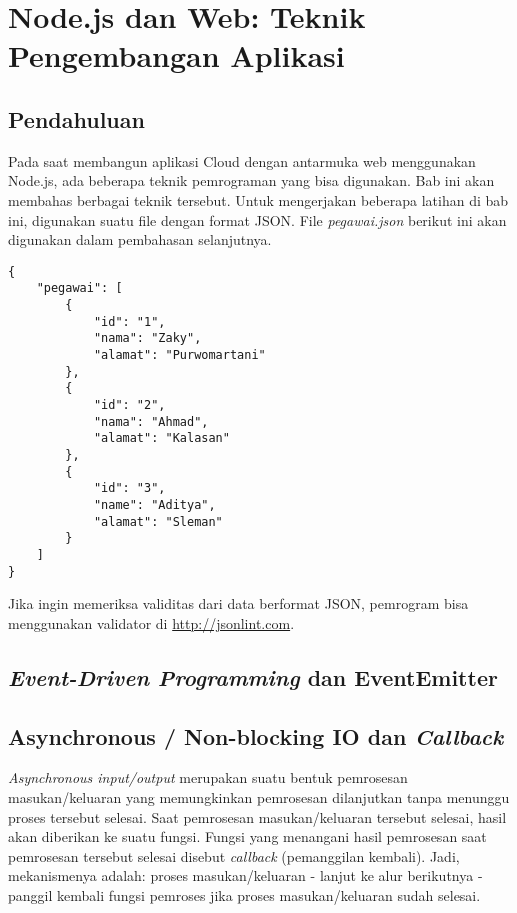 \chapter{Node.js dan Web: Teknik Pengembangan Aplikasi}

\section{Pendahuluan}

Pada saat membangun aplikasi Cloud dengan antarmuka web menggunakan Node.js, ada beberapa teknik pemrograman yang bisa digunakan. Bab ini akan membahas berbagai teknik tersebut. Untuk mengerjakan beberapa latihan di bab ini, digunakan suatu file dengan format JSON. File \textit{pegawai.json} berikut ini akan digunakan dalam pembahasan selanjutnya.

\lstset{language=JavaScript,caption=pegawai.json}
\begin{lstlisting}
{
    "pegawai": [
        {
            "id": "1",
            "nama": "Zaky",
            "alamat": "Purwomartani"
        },
        {
            "id": "2",
            "nama": "Ahmad",
            "alamat": "Kalasan"
        },
        {
            "id": "3",
            "name": "Aditya",
            "alamat": "Sleman"
        }
    ]
}
\end{lstlisting}

Jika ingin memeriksa validitas dari data berformat JSON, pemrogram bisa menggunakan validator di \url{http://jsonlint.com}.

\section{\textit{Event-Driven Programming} dan EventEmitter}



\section{Asynchronous / Non-blocking IO dan \textit{Callback}}

\textit{Asynchronous input/output} merupakan suatu bentuk pemrosesan masukan/keluaran yang memungkinkan pemrosesan dilanjutkan tanpa menunggu proses tersebut selesai. Saat pemrosesan masukan/keluaran tersebut selesai, hasil akan diberikan ke suatu fungsi. Fungsi yang menangani hasil pemrosesan saat pemrosesan tersebut selesai disebut \textit{callback} (pemanggilan kembali). Jadi, mekanismenya adalah: proses masukan/keluaran - lanjut ke alur berikutnya - panggil kembali fungsi pemroses jika proses masukan/keluaran sudah selesai.

